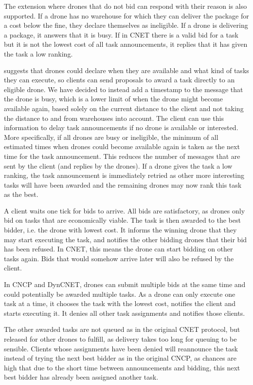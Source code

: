 \documentclass[10pt,a4paper,twocolumn]{article}
\begin{document}
The extension where drones that do not bid can respond with their reason is also supported. If a drone has no warehouse for which they can deliver the package for a cost below the fine, they declare themselves as ineligible. If a drone is delivering a package, it answers that it is busy. If in CNET there is a valid bid for a task but it is not the lowest cost of all task announcements, it replies that it has given the task a low ranking.

\cite{CNET} suggests that drones could declare when they are available and what kind of tasks they can execute, so clients can send proposals to award a task directly to an eligible drone. We have decided to instead add a timestamp to the message that the drone is busy, which is a lower limit of when the drone might become available again, based solely on the current distance to the client and not taking the distance to and from warehouses into account. The client can use this information to delay task announcements if no drone is available or interested. More specifically, if all drones are busy or ineligible, the minimum of all estimated times when drones could become available again is taken as the next time for the task announcement. This reduces the number of messages that are sent by the client (and replies by the drones). If a drone gives the task a low ranking, the task announcement is immediately retried as other more interesting tasks will have been awarded and the remaining drones may now rank this task as the best.

A client waits one tick for bids to arrive. All bids are satisfactory, as drones only bid on tasks that are economically viable. The task is then awarded to the best bidder, i.e. the drone with lowest cost. It informs the winning drone that they may start executing the task, and notifies the other bidding drones that their bid has been refused. In CNET, this means the drone can start bidding on other tasks again. Bids that would somehow arrive later will also be refused by the client.

In CNCP and DynCNET, drones can submit multiple bids at the same time and could potentially be awarded multiple tasks. As a drone can only execute one task at a time, it chooses the task with the lowest cost, notifies the client and starts executing it. It denies all other task assignments and notifies those clients.

The other awarded tasks are not queued as in the original CNET protocol, but released for other drones to fulfill, as delivery takes too long for queuing to be sensible. Clients whose assignments have been denied will reannounce the task instead of trying the next best bidder as in the original CNCP, as chances are high that due to the short time between announcements and bidding, this next best bidder has already been assigned another task. 
\end{document}
